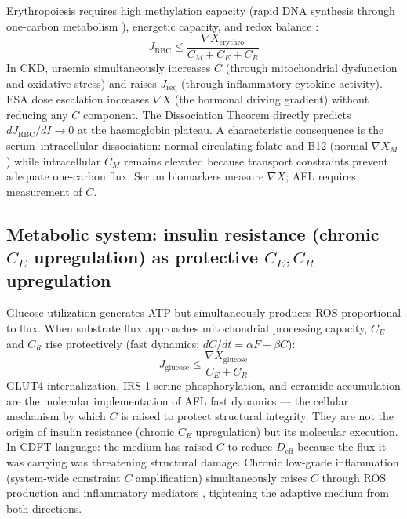 \documentclass[11pt]{article}
\newcommand{\Jreq}{J_{\mathrm{req}}}
\begin{document}
Erythropoiesis requires high methylation capacity (rapid DNA synthesis through one-carbon metabolism \citep{stover2009}), energetic capacity, and redox balance \citep{vaziri2004}:
\begin{equation}
J_{\mathrm{RBC}} \leq \frac{\nabla X_{\mathrm{erythro}}}{C_M + C_E + C_R}
\label{eq:erythro}
\end{equation}
In CKD, uraemia simultaneously increases $C$ (through mitochondrial dysfunction and oxidative stress) and raises $\Jreq$ (through inflammatory cytokine activity). ESA dose escalation increases $\nabla X$ (the hormonal driving gradient) without reducing any $C$ component. The Dissociation Theorem directly predicts $dJ_{\mathrm{RBC}}/dI \to 0$ at the haemoglobin plateau. A characteristic consequence is the serum--intracellular dissociation: normal circulating folate and B12 (normal $\nabla X_M$) while intracellular $C_M$ remains elevated because transport constraints prevent adequate one-carbon flux. Serum biomarkers measure $\nabla X$; AFL requires measurement of $C$.

\subsection{Metabolic system: insulin resistance (chronic $C_E$ upregulation) as protective $C_E, C_R$ upregulation}

Glucose utilization generates ATP but simultaneously produces ROS proportional to flux. When substrate flux approaches mitochondrial processing capacity, $C_E$ and $C_R$ rise protectively (fast dynamics: $dC/dt = \alpha F - \beta C$):
\begin{equation}
J_{\mathrm{glucose}} \leq \frac{\nabla X_{\mathrm{glucose}}}{C_E + C_R}
\label{eq:glucose}
\end{equation}
GLUT4 internalization, IRS-1 serine phosphorylation, and ceramide accumulation \citep{PetersenShulman2018,SamuelShulman2016} are the molecular implementation of AFL fast dynamics --- the cellular mechanism by which $C$ is raised to protect structural integrity. They are not the origin of insulin resistance (chronic $C_E$ upregulation) but its molecular execution. In CDFT language: the medium has raised $C$ to reduce $D_{\mathrm{eff}}$ because the flux it was carrying was threatening structural damage. Chronic low-grade inflammation (system-wide constraint $C$ amplification) simultaneously raises $C$ through ROS production and inflammatory mediators \citep{Hotamisligil2006}, tightening the adaptive medium from both directions.
\end{document}

